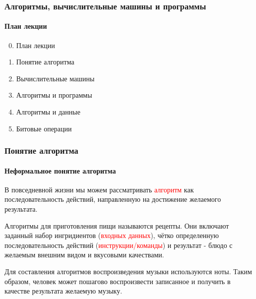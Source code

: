 \documentclass[aspectratio=169]{beamer}
\begin{document}
\begin{frame}
\frametitle{Алгоритмы, вычислительные машины и программы}
\framesubtitle{План лекции}

\begin{enumerate}
  \setcounter{enumi}{-1}
  \item{План лекции}
  \item{Понятие алгоритма}
  \item{Вычислительные машины}
  \item{Алгоритмы и программы}
  \item{Алгоритмы и данные}
  \item{Битовые операции}

\end{enumerate}
\end{frame}

\begin{frame}
\frametitle{Понятие алгоритма}
\framesubtitle{Неформальное понятие алгоритма}
\justifying
В повседневной жизни мы можем рассматривать \textcolor{red}{алгоритм} как последовательность действий, направленную на достижение желаемого результата.\newline

Алгоритмы для приготовления пищи называются рецепты.
Они включают заданный набор ингридиентов (\textcolor{red}{входных данных}), чётко определенную последовательность действий (\textcolor{red}{инструкции/команды}) и результат - блюдо с желаемым внешним видом и вкусовыми качествами.\newline

Для составления алгоритмов воспроизведения музыки используются ноты. Таким образом, человек может пошагово воспроизвести записанное и получить в качестве результата желаемую музыку.

\end{frame}
\end{document}
